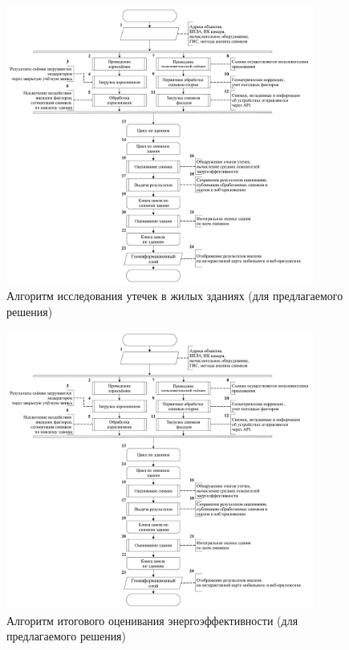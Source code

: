 	\begin{figure}[h!]
      \centering
      \includegraphics[width=0.9\textwidth]{images/am/am0_after}
      \caption{Алгоритм исследования утечек в жилых зданиях (для предлагаемого решения)}
      \label{am:after:common}
    \end{figure}

    \begin{figure}[t!]
      \centering
      \includegraphics[width=0.9\textwidth]{images/am/am0_after}
      \caption{Алгоритм итогового оценивания энергоэффективности (для предлагаемого решения)}
      \label{am:after:integral}
    \end{figure}


